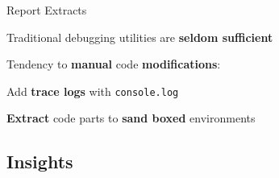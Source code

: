 \documentclass[aspectratio=169]{beamer}
\begin{document}
\begin{frame}[fragile]{Report Extracts}
	\begin{vfilleditems}
		\item Traditional debugging utilities are \textbf{seldom sufficient}
		\item Tendency to \textbf{manual} code \textbf{modifications}:
		\begin{vfilleditems}
		    \item Add \textbf{trace logs} with \texttt{console.log}
		    \item \textbf{Extract} code parts to \textbf{sand boxed} environments
		\end{vfilleditems}
	\end{vfilleditems}
\end{frame}


\subsection{Insights}
\end{document}
